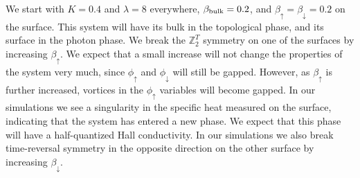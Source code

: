 \documentclass[prb,twocolumn]{revtex4-1}
\def\ztwot{\mathbb{Z}_2^T}
\begin{document}
We start with $K=0.4$ and $\lambda=8$ everywhere, $\beta_{\rm bulk}=0.2$, and $\beta_{\uparrow}=\beta_{\downarrow}=0.2$ on the surface. This system will have its bulk in the topological phase, and its surface in the photon phase. We break the $\ztwot$ symmetry on one of the surfaces by increasing $\beta_{\uparrow}$. We expect that a small increase will not change the properties of the system very much, since $\phi_\uparrow$ and $\phi_\downarrow$ will still be gapped.\cite{LesikAshvin2} However, as $\beta_\uparrow$ is further increased, vortices in the $\phi_\uparrow$ variables will become gapped. In our simulations we see a singularity in the specific heat measured on the surface, indicating that the system has entered a new phase. We expect that this phase will have a half-quantized Hall conductivity. In our simulations we also break time-reversal symmetry in the opposite direction on the other surface by increasing $\beta_\downarrow$. 
\end{document}

